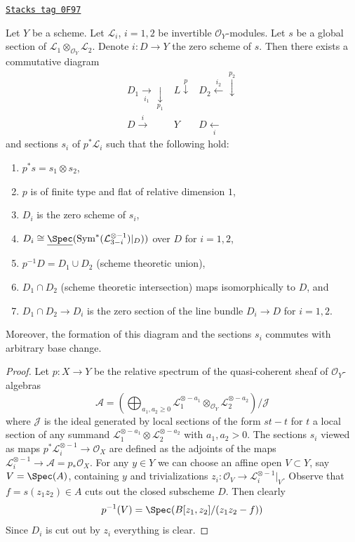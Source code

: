 \begin{lemma}
\label{chow-lemma-decompose-section}
\href{https://stacks.math.columbia.edu/tag/0F97}{\texttt{Stacks tag 0F97}}

Let $Y$ be a scheme. Let $\mathcal{L}_i$, $i = 1, 2$ be invertible
$\mathcal{O}_Y$-modules. Let $s$ be a global section of
$\mathcal{L}_1 \otimes_{\mathcal{O}_Y} \mathcal{L}_2$.
Denote $i : D \to Y$ the zero scheme of $s$.
Then there exists a commutative diagram
$$
\begin{array}{ccc}D_1 \underset{i_1}{\longrightarrow}\underset{p_1}{\downarrow} & L \overset{p}{\downarrow} & D_2 \overset{i_2}{\longleftarrow}\overset{p_2}{\downarrow} \\ D \overset{i}{\longrightarrow} & Y & D \underset{i}{\longleftarrow}\end{array}
$$
and sections $s_i$ of $p^*\mathcal{L}_i$ such that
the following hold:
\begin{enumerate}
\item $p^*s = s_1 \otimes s_2$,
\item $p$ is of finite type and flat of relative dimension $1$,
\item $D_i$ is the zero scheme of $s_i$,
\item $D_i \cong
\underline{\Spec}(\text{Sym}^*(\mathcal{L}_{3 - i}^{\otimes -1})|_D))$
over $D$ for $i = 1, 2$,
\item $p^{-1}D = D_1 \cup D_2$ (scheme theoretic union),
\item $D_1 \cap D_2$ (scheme theoretic intersection) maps
isomorphically to $D$, and
\item $D_1 \cap D_2 \to D_i$
is the zero section of the line bundle $D_i \to D$ for $i = 1, 2$.
\end{enumerate}
Moreover, the formation of this diagram and the sections $s_i$
commutes with arbitrary base change.
\end{lemma}

\begin{proof}
Let $p : X \to Y$ be the relative spectrum of the quasi-coherent
sheaf of $\mathcal{O}_Y$-algebras
$$
\mathcal{A} =
\left(\bigoplus\nolimits_{a_1, a_2 \geq 0}
\mathcal{L}_1^{\otimes -a_1} \otimes_{\mathcal{O}_Y}
\mathcal{L}_2^{\otimes -a_2}\right)/\mathcal{J}
$$
where $\mathcal{J}$ is the ideal generated by local sections of
the form $st - t$ for $t$ a local section of any summand
$\mathcal{L}_1^{\otimes -a_1} \otimes \mathcal{L}_2^{\otimes -a_2}$
with $a_1, a_2 > 0$. The sections $s_i$ viewed as maps
$p^*\mathcal{L}_i^{\otimes -1} \to \mathcal{O}_X$ are defined as the adjoints
of the maps $\mathcal{L}_i^{\otimes -1} \to \mathcal{A} = p_*\mathcal{O}_X$.
For any $y \in Y$ we can choose an affine
open $V \subset Y$, say $V = \Spec(A)$, containing $y$ and
trivializations $z_i : \mathcal{O}_V \to \mathcal{L}_i^{\otimes -1}|_V$.
Observe that $f = s(z_1z_2) \in A$ cuts out the closed subscheme $D$.
Then clearly
$$
p^{-1}(V) = \Spec(B[z_1, z_2]/(z_1 z_2 - f))
$$
Since $D_i$ is cut out by $z_i$ everything is clear.
\end{proof}

